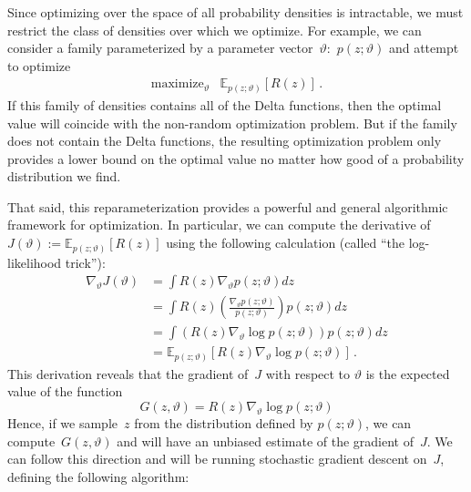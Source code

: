 \documentclass{tufte-book}
\begin{document}
Since optimizing over the space of all probability densities is
intractable, we must restrict the class of densities over which we
optimize. For example, we can consider a family parameterized by a
parameter vector~\(\vartheta\):~\(p(z;\vartheta)\) and attempt to
optimize \[
\begin{array}{ll}
    \text{maximize}_{\vartheta} & \mathbb{E}_{p(z;\vartheta)}[R(z)] \,.
\end{array}
\] If this family of densities contains all of the Delta functions, then
the optimal value will coincide with the non-random optimization
problem. But if the family does not contain the Delta functions, the
resulting optimization problem only provides a lower bound on the
optimal value no matter how good of a probability distribution we find.

That said, this reparameterization provides a powerful and general
algorithmic framework for optimization. In particular, we can compute
the derivative of~\(J(\vartheta):= \mathbb{E}_{p(z;\vartheta)}[R(z)]\)
using the following calculation (called ``the log-likelihood trick''):
\[
\begin{aligned}
    \nabla_{\vartheta} J(\vartheta) &= \int R(z) \nabla_{\vartheta} p(z;\vartheta) dz\\
    &= \int R(z) \left(\frac{\nabla_{\vartheta} p(z;\vartheta)}{p(z;\vartheta)}\right) p(z;\vartheta) dz\\
    &= \int \left( R(z) \nabla_{\vartheta} \log p(z;\vartheta) \right) p(z;\vartheta)dz \\
  &= \mathbb{E}_{p(z;\vartheta)}\left[ R(z) \nabla_{\vartheta} \log p(z;\vartheta) \right]\,.
\end{aligned}
\] This derivation reveals that the gradient of~\(J\) with respect to
\(\vartheta\) is the expected value of the function \[
    G(z,\vartheta) = R(z) \nabla_{\vartheta} \log p(z;\vartheta)
\] Hence, if we sample~\(z\) from the distribution defined by
\(p(z;\vartheta)\), we can compute~\(G(z,\vartheta)\) and will have an
unbiased estimate of the gradient of~\(J\). We can follow this direction
and will be running stochastic gradient descent on~\(J\), defining the
following algorithm:
\end{document}
